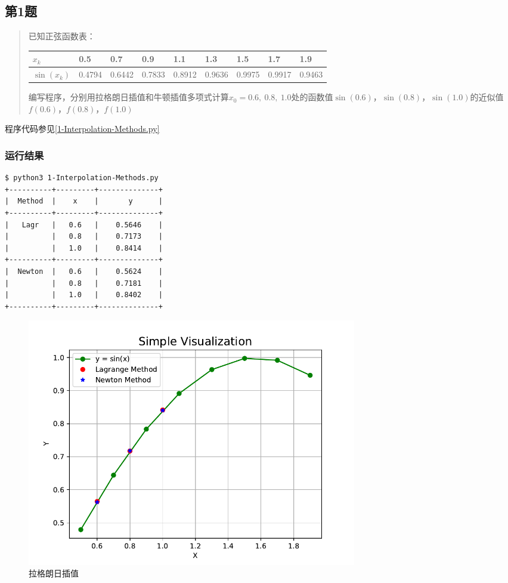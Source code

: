 \subsection{第1题}
\begin{quote}
    {\kaishu
        已知正弦函数表：
        \begin{table}[H]
            \centering
            \begin{tabular}{@{}lllllllll@{}}
            \toprule
                $x_k$ & 0.5 & 0.7 & 0.9 & 1.1 & 1.3 & 1.5 & 1.7 & 1.9 \\ \midrule
                $\sin(x_k)$ & 0.4794 & 0.6442 & 0.7833 & 0.8912 & 0.9636 & 0.9975 & 0.9917 & 0.9463\\ \bottomrule
            \end{tabular}%
        \end{table}
        编写程序，分别用拉格朗日插值和牛顿插值多项式计算$x_0=0.6,\ 0.8,\ 1.0$处的函数值$\sin(0.6)$，$\sin(0.8)$，$\sin(1.0)$的近似值$f(0.6)$，$f(0.8)$，$f(1.0)$
    }
\end{quote}

程序代码参见\ref{1-Interpolation-Methods.py}
\subsubsection{运行结果}

\begin{lstlisting}[style = bash]
$ python3 1-Interpolation-Methods.py 
+----------+---------+--------------+
|  Method  |    x    |       y      |
+----------+---------+--------------+
|   Lagr   |   0.6   |    0.5646    |
|          |   0.8   |    0.7173    |
|          |   1.0   |    0.8414    |
+----------+---------+--------------+
|  Newton  |   0.6   |    0.5624    |
|          |   0.8   |    0.7181    |
|          |   1.0   |    0.8402    |
+----------+---------+--------------+
\end{lstlisting}

\begin{figure}[H]
    \centering
    \includegraphics[width=0.7\textwidth]{../../img/06/lagrange.pdf}
    \caption{拉格朗日插值}
    \label{Fig:Lagrange}
\end{figure}

